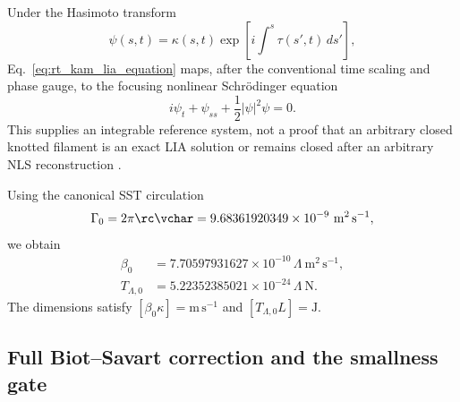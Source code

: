 Under the Hasimoto transform
\begin{equation}
    \psi(s,t)
    =
    \kappa(s,t)
    \exp\!\left[
    i\int^s\tau(s',t)\,ds'
    \right],
    \label{eq:rt_kam_hasimoto_transform}
\end{equation}
Eq.~\eqref{eq:rt_kam_lia_equation} maps, after the conventional time scaling
and phase gauge, to the focusing nonlinear Schr\"odinger equation
\begin{equation}
    i\psi_t+\psi_{ss}+\frac12|\psi|^2\psi=0.
    \label{eq:rt_kam_focusing_nlse}
\end{equation}
This supplies an integrable reference system, not a proof that an arbitrary
closed knotted filament is an exact LIA solution or remains closed after an
arbitrary NLS reconstruction \cite{Hasimoto1972,JerrardSeis2017}.

Using the canonical SST circulation
\begin{equation}
    \Gamma_0
    =
    2\pi\rc\vchar
    =
    9.68361920349\times10^{-9}\ \mathrm{m^2\,s^{-1}},
    \label{eq:rt_kam_gamma_numeric}
\end{equation}
we obtain
\begin{align}
    \beta_0
    &=
    7.70597931627\times10^{-10}\,\Lambda
    \ \mathrm{m^2\,s^{-1}},
    \label{eq:rt_kam_beta_numeric}
    \\
    T_{\Lambda,0}
    &=
    5.22352385021\times10^{-24}\,\Lambda
    \ \mathrm{N}.
    \label{eq:rt_kam_line_tension_numeric}
\end{align}
The dimensions satisfy
\([\beta_0\kappa]=\mathrm{m\,s^{-1}}\) and
\([T_{\Lambda,0}L]=\mathrm J\).

\subsection{Full Biot--Savart correction and the smallness gate}
\label{subsec:rt_kam_biot_savart_perturbation}

